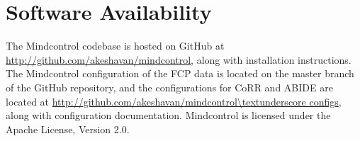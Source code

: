 \section{Software Availability}

 The Mindcontrol codebase is hosted on GitHub at \url{http://github.com/akeshavan/mindcontrol}, along with installation instructions. The Mindcontrol configuration of the FCP data is located on the master branch of the GitHub repository, and the configurations for CoRR and ABIDE are located at \url{http://github.com/akeshavan/mindcontrol\textunderscore configs}, along with configuration documentation. Mindcontrol is licensed under the Apache License, Version 2.0.

